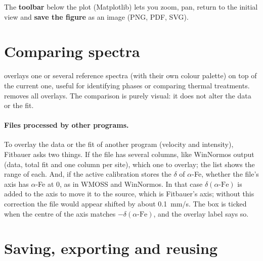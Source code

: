 The \textbf{toolbar} below the plot (Matplotlib) lets you zoom, pan, return to
the initial view and \textbf{save the figure} as an image (PNG, PDF, SVG).


\section{Comparing spectra}
\label{sec:comparar}

 overlays one or several reference spectra (with
their own colour palette) on top of the current one, useful for identifying
phases or comparing thermal treatments.  removes
all overlays. The comparison is purely visual: it does not alter the data or the
fit.

\paragraph{Files processed by other programs.} To overlay the data or the fit of
another program (velocity and intensity), Fitbauer asks two things. If the file
has several columns, like WinNormos output (data, total fit and one column per
site), which one to overlay; the list shows the range of each. And, if the active
calibration stores the $\delta$ of $\alpha$-Fe, whether the file's axis has
$\alpha$-Fe at 0, as in WMOSS and WinNormos. In that case $\delta(\alpha\text{-Fe})$
is added to the axis to move it to the source, which is Fitbauer's axis; without
this correction the file would appear shifted by about 0.1~mm/s. The box is
ticked when the centre of the axis matches $-\delta(\alpha\text{-Fe})$, and the
overlay label says so.

\section{Saving, exporting and reusing}


